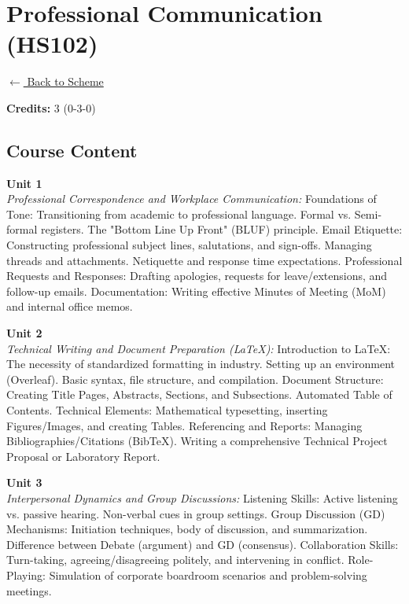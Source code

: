 \section*{Professional Communication (HS102)}
\label{course:HS102}

\noindent \small{\hyperref[main:scheme]{$\leftarrow$ Back to Scheme}} \vspace{0.5cm}

\noindent \textbf{Credits:} 3 (0-3-0)

\subsection*{Course Content}
\noindent\textbf{Unit 1} \\
\textit{Professional Correspondence and Workplace Communication:} Foundations of Tone: Transitioning from academic to professional language. Formal vs. Semi-formal registers. The "Bottom Line Up Front" (BLUF) principle. Email Etiquette: Constructing professional subject lines, salutations, and sign-offs. Managing threads and attachments. Netiquette and response time expectations. Professional Requests and Responses: Drafting apologies, requests for leave/extensions, and follow-up emails. Documentation: Writing effective Minutes of Meeting (MoM) and internal office memos.

\vspace{0.3cm}

\noindent\textbf{Unit 2} \\
\textit{Technical Writing and Document Preparation (LaTeX):} Introduction to LaTeX: The necessity of standardized formatting in industry. Setting up an environment (Overleaf). Basic syntax, file structure, and compilation. Document Structure: Creating Title Pages, Abstracts, Sections, and Subsections. Automated Table of Contents. Technical Elements: Mathematical typesetting, inserting Figures/Images, and creating Tables. Referencing and Reports: Managing Bibliographies/Citations (BibTeX). Writing a comprehensive Technical Project Proposal or Laboratory Report.

\vspace{0.3cm}

\noindent\textbf{Unit 3} \\
\textit{Interpersonal Dynamics and Group Discussions:} Listening Skills: Active listening vs. passive hearing. Non-verbal cues in group settings. Group Discussion (GD) Mechanisms: Initiation techniques, body of discussion, and summarization. Difference between Debate (argument) and GD (consensus). Collaboration Skills: Turn-taking, agreeing/disagreeing politely, and intervening in conflict. Role-Playing: Simulation of corporate boardroom scenarios and problem-solving meetings.

